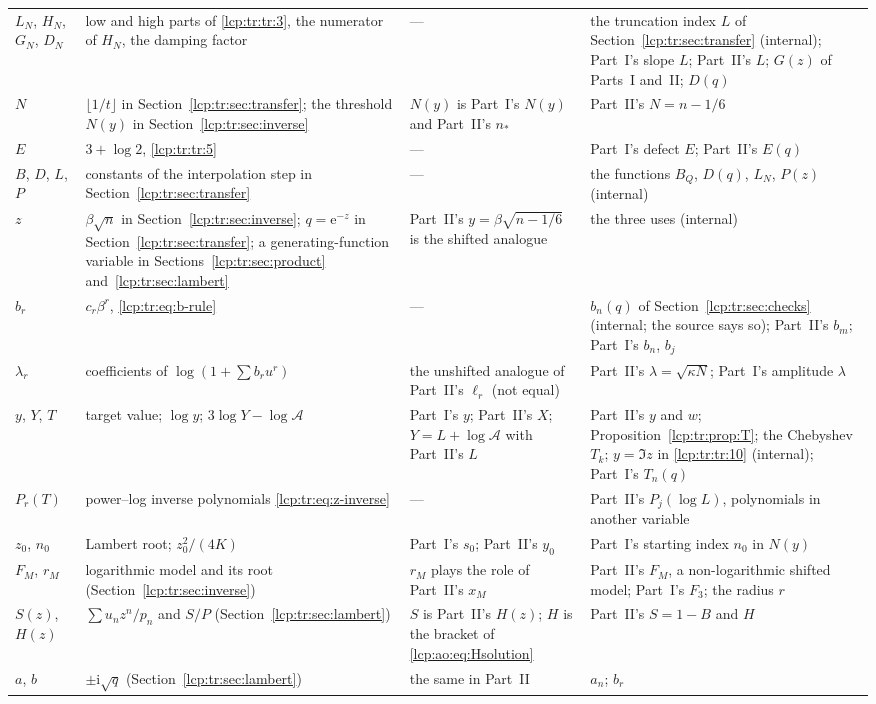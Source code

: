 \documentclass[11pt]{article}
\numberwithin{equation}{section}
\theoremstyle{definition}\newtheorem{definition}[theorem]{Definition}
\theoremstyle{remark}\newtheorem{remark}[theorem]{Remark}
\newcommand{\ee}{\mathrm e}
\newcommand{\ii}{\mathrm i}%
\begin{document}
{\begin{longtable}{@{}>{\raggedright}p{}>{\raggedright}p{}>{\raggedright}p{}>{\raggedright\arraybackslash}p{}@{}}
$L_N$, $H_N$, $G_N$, $D_N$ & low and high parts of \eqref{lcp:tr:tr:3}, the numerator of $H_N$, the damping factor & --- & the truncation index $L$ of Section~\ref{lcp:tr:sec:transfer} (internal); Part~I's slope $L$; Part~II's $L$; $G(z)$ of Parts~I and~II; $D(q)$\\
$N$ & $\lfloor1/t\rfloor$ in Section~\ref{lcp:tr:sec:transfer}; the threshold $N(y)$ in Section~\ref{lcp:tr:sec:inverse} & $N(y)$ is Part~I's $N(y)$ and Part~II's $n_*$ & Part~II's $N=n-1/6$\\
$E$ & $3+\log2$, \eqref{lcp:tr:tr:5} & --- & Part~I's defect $E$; Part~II's $E(q)$\\
$B$, $D$, $L$, $P$ & constants of the interpolation step in Section~\ref{lcp:tr:sec:transfer} & --- & the functions $B_Q$, $D(q)$, $L_N$, $P(z)$ (internal)\\
$z$ & $\beta\sqrt n$ in Section~\ref{lcp:tr:sec:inverse}; $q=\ee^{-z}$ in Section~\ref{lcp:tr:sec:transfer}; a generating-function variable in Sections~\ref{lcp:tr:sec:product} and~\ref{lcp:tr:sec:lambert} & Part~II's $y=\beta\sqrt{n-1/6}$ is the shifted analogue & the three uses (internal)\\
$b_r$ & $c_r\beta^r$, \eqref{lcp:tr:eq:b-rule} & --- & $b_n(q)$ of Section~\ref{lcp:tr:sec:checks} (internal; the source says so); Part~II's $b_m$; Part~I's $b_n$, $b_j$\\
$\lambda_r$ & coefficients of $\log(1+\sum b_ru^r)$ & the unshifted analogue of Part~II's $\ell_r$ (not equal) & Part~II's $\lambda=\sqrt{\kappa N}$; Part~I's amplitude $\lambda$\\
$y$, $Y$, $T$ & target value; $\log y$; $3\log Y-\log\mathcal A$ & Part~I's $y$; Part~II's $X$; $Y=L+\log\mathcal A$ with Part~II's $L$ & Part~II's $y$ and $w$; Proposition~\ref{lcp:tr:prop:T}; the Chebyshev $T_k$; $y=\Im z$ in \eqref{lcp:tr:tr:10} (internal); Part~I's $T_n(q)$\\
$P_r(T)$ & power--log inverse polynomials \eqref{lcp:tr:eq:z-inverse} & --- & Part~II's $P_j(\log L)$, polynomials in another variable\\
$z_0$, $n_0$ & Lambert root; $z_0^2/(4K)$ & Part~I's $s_0$; Part~II's $y_0$ & Part~I's starting index $n_0$ in $N(y)$\\
$F_M$, $r_M$ & logarithmic model and its root (Section~\ref{lcp:tr:sec:inverse}) & $r_M$ plays the role of Part~II's $x_M$ & Part~II's $F_M$, a non-logarithmic shifted model; Part~I's $F_3$; the radius $r$\\
$S(z)$, $H(z)$ & $\sum u_nz^n/p_n$ and $S/P$ (Section~\ref{lcp:tr:sec:lambert}) & $S$ is Part~II's $H(z)$; $H$ is the bracket of \eqref{lcp:ao:eq:Hsolution} & Part~II's $S=1-B$ and $H$\\
$a$, $b$ & $\pm\ii\sqrt q$ (Section~\ref{lcp:tr:sec:lambert}) & the same in Part~II & $a_n$; $b_r$\\
\end{longtable}}
\end{document}
